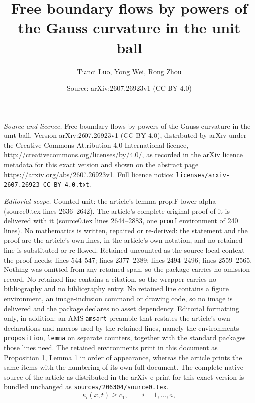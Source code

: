 \documentclass[10pt,a4paper]{amsart}
\title{Free boundary flows by powers of the Gauss curvature in the unit ball}
\author{Tianci Luo, Yong Wei, Rong Zhou}
\date{Source: arXiv:2607.26923v1 (CC BY 4.0)}
\begin{document}
\maketitle

\noindent\emph{Source and licence.} Free boundary flows by powers of the Gauss curvature in the unit ball. Version arXiv:2607.26923v1 (CC BY 4.0), distributed by arXiv under the Creative Commons Attribution 4.0 International licence, http://creativecommons.org/licenses/by/4.0/, as recorded in the arXiv licence metadata for this exact version and shown on the abstract page https://arxiv.org/abs/2607.26923v1. Full licence notice: \texttt{licenses/arxiv-2607.26923-CC-BY-4.0.txt}.\par\smallskip

\noindent\textit{Editorial scope.} Counted unit: the article's lemma prop:F-lower-alpha (source0.tex lines 2636--2642). The article's complete original proof of it is delivered with it (source0.tex lines 2644--2883, one \texttt{proof} environment of 240 lines). No mathematics is written, repaired or re-derived: the statement and the proof are the article's own lines, in the article's own notation, and no retained line is substituted or re-flowed.  Retained uncounted as the source-local context the proof needs: lines 544--547; lines 2377--2389; lines 2494--2496; lines 2559--2565.  Nothing was omitted from any retained span, so the package carries no omission record.  No retained line contains a citation, so the wrapper carries no bibliography and no bibliography entry.  No retained line contains a figure environment, an image-inclusion command or drawing code, so no image is delivered and the package declares no asset dependency.  Editorial formatting only, in addition: an AMS \texttt{amsart} preamble that restates the article's own declarations and macros used by the retained lines, namely the environments \texttt{proposition}, \texttt{lemma} on separate counters, together with the standard packages those lines need.  The retained environments print in this document as Proposition 1, Lemma 1 in order of appearance, whereas the article prints the same items with the numbering of its own full document.  The complete native source of the article as distributed in the arXiv e-print for this exact version is bundled unchanged as \texttt{sources/206304/source0.tex}.
\begin{equation}\label{eq:kappa-lower-alpha}
        \kappa_i(x,t)\ge c_1,
        \qquad i=1,\ldots,n,
\end{equation}
\end{document}
